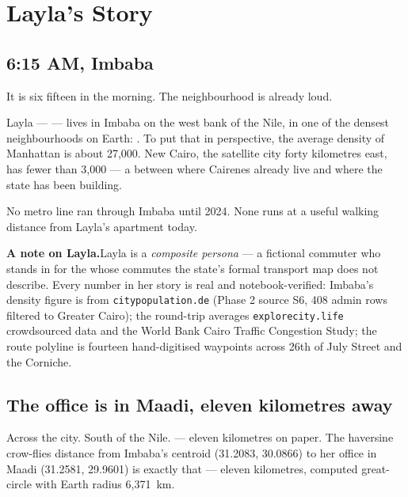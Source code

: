 
\section{Layla's Story}
\label{sec:layla}

\subsection{6:15 AM, Imbaba}

It is six fifteen in the morning. The neighbourhood is already loud.

Layla —  — lives in Imbaba on the west bank of the Nile, in
one of the densest neighbourhoods on Earth: . To put that in perspective, the average density of
Manhattan is about 27{,}000. New Cairo, the satellite city forty
kilometres east, has fewer than 3{,}000 — a 
between where Cairenes already live and where the state has been
building.

No metro line ran through Imbaba until 2024. None runs at a useful
walking distance from Layla's apartment today.

\begin{callout}
\textbf{\color{plotblue}A note on Layla.}\quad Layla is a \emph{composite
persona} — a fictional commuter who stands in for the
 whose commutes the state's formal
transport map does not describe. Every number in her story is real and
notebook-verified: Imbaba's density figure is from \texttt{citypopulation.de}
(Phase 2 source S6, 408 admin rows filtered to Greater Cairo); the
 round-trip averages \texttt{explorecity.life}
crowdsourced data and the World Bank Cairo Traffic Congestion Study;
the route polyline is fourteen hand-digitised waypoints across 26th of
July Street and the Corniche.
\end{callout}

\subsection{The office is in Maadi, eleven kilometres away}

Across the city. South of the Nile.  — eleven
kilometres on paper. The haversine crow-flies distance from Imbaba's
centroid (31.2083\textdegree, 30.0866\textdegree) to her office in
Maadi (31.2581\textdegree, 29.9601\textdegree) is exactly that — eleven
kilometres, computed great-circle with Earth radius \mbox{6{,}371 km}.

